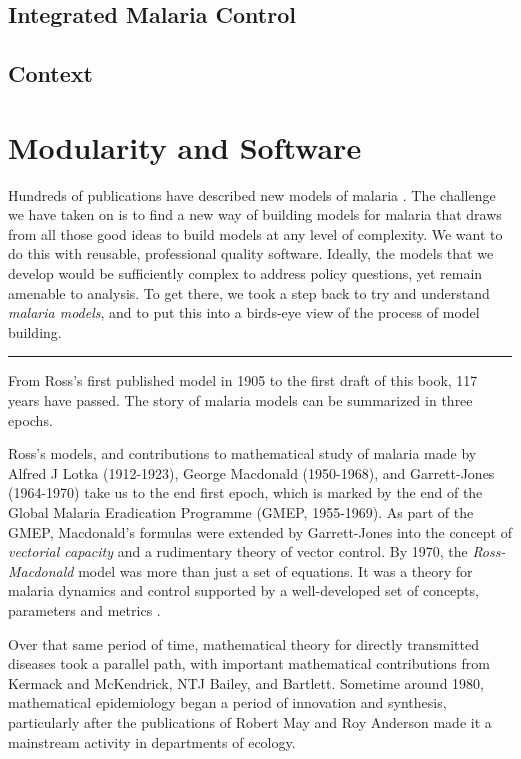 \documentclass[
]{book}
\begin{document}
\section{Integrated Malaria Control}\label{integrated-malaria-control}

\section{Context}\label{context}

\chapter{Modularity and Software}\label{modularity-and-software}

Hundreds of publications have described new models of malaria \autocite{ReinerRC2013SystematicReview,SmithNR2018AgentbasedModels}. The challenge we have taken on is to find a new way of building models for malaria that draws from all those good ideas to build models at any level of complexity. We want to do this with reusable, professional quality software. Ideally, the models that we develop would be sufficiently complex to address policy questions, yet remain amenable to analysis. To get there, we took a step back to try and understand \emph{malaria models}, and to put this into a birds-eye view of the process of model building.

\begin{center}\rule{0.5\linewidth}{0.5pt}\end{center}

From Ross's first published model in 1905 to the first draft of this book, 117 years have passed. The story of malaria models can be summarized in three epochs.

Ross's models, and contributions to mathematical study of malaria made by Alfred J Lotka (1912-1923), George Macdonald (1950-1968), and Garrett-Jones (1964-1970) take us to the end first epoch, which is marked by the end of the Global Malaria Eradication Programme (GMEP, 1955-1969). As part of the GMEP, Macdonald's formulas were extended by Garrett-Jones into the concept of \emph{vectorial capacity} and a rudimentary theory of vector control. By 1970, the \emph{Ross-Macdonald} model was more than just a set of equations. It was a theory for malaria dynamics and control supported by a well-developed set of concepts, parameters and metrics \autocite{SmithDL2012_RossMacdonald}.

Over that same period of time, mathematical theory for directly transmitted diseases took a parallel path, with important mathematical contributions from Kermack and McKendrick, NTJ Bailey, and Bartlett. Sometime around 1980, mathematical epidemiology began a period of innovation and synthesis, particularly after the publications of Robert May and Roy Anderson made it a mainstream activity in departments of ecology.
\end{document}
